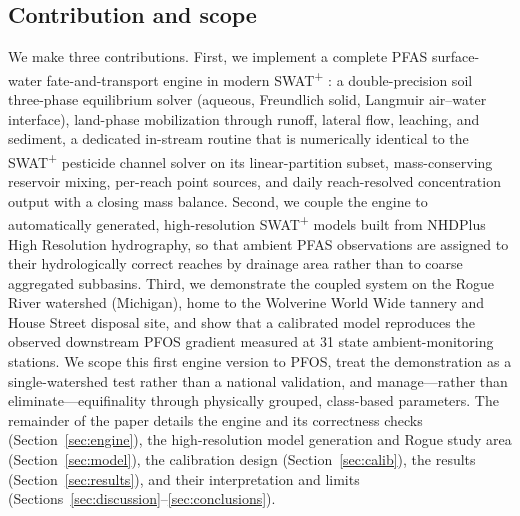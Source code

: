 \subsection{Contribution and scope}
We make three contributions. First, we implement a complete PFAS surface-water fate-and-transport engine in modern SWAT\textsuperscript{+} \citep{bieger2017}: a double-precision soil three-phase equilibrium solver (aqueous, Freundlich solid, Langmuir air--water interface), land-phase mobilization through runoff, lateral flow, leaching, and sediment, a dedicated in-stream routine that is numerically identical to the SWAT\textsuperscript{+} pesticide channel solver on its linear-partition subset, mass-conserving reservoir mixing, per-reach point sources, and daily reach-resolved concentration output with a closing mass balance. Second, we couple the engine to automatically generated, high-resolution SWAT\textsuperscript{+} models built from NHDPlus High Resolution hydrography, so that ambient PFAS observations are assigned to their hydrologically correct reaches by drainage area rather than to coarse aggregated subbasins. Third, we demonstrate the coupled system on the Rogue River watershed (Michigan), home to the Wolverine World Wide tannery and House Street disposal site, and show that a calibrated model reproduces the observed downstream PFOS gradient measured at 31 state ambient-monitoring stations. We scope this first engine version to PFOS, treat the demonstration as a single-watershed test rather than a national validation, and manage---rather than eliminate---equifinality through physically grouped, class-based parameters. The remainder of the paper details the engine and its correctness checks (Section~\ref{sec:engine}), the high-resolution model generation and Rogue study area (Section~\ref{sec:model}), the calibration design (Section~\ref{sec:calib}), the results (Section~\ref{sec:results}), and their interpretation and limits (Sections~\ref{sec:discussion}--\ref{sec:conclusions}).

